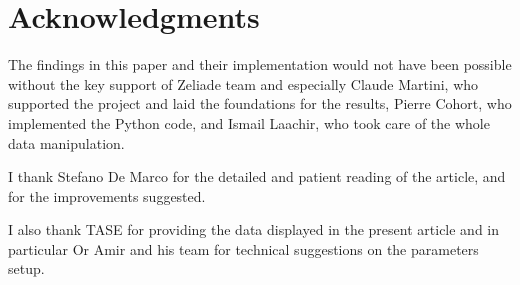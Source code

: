 \documentclass{article}
\begin{document}
	\hypertarget{acknowledgments}{%
\section{Acknowledgments}\label{acknowledgments}}

	The findings in this paper and their implementation would not have been
possible without the key support of Zeliade team and especially Claude
Martini, who supported the project and laid the foundations for the
results, Pierre Cohort, who implemented the Python code, and Ismail
Laachir, who took care of the whole data manipulation.

I thank Stefano De Marco for the detailed and patient reading of the
article, and for the improvements suggested.

I also thank TASE for providing the data displayed in the present
article and in particular Or Amir and his team for technical suggestions
on the parameters setup.



    
    
\newpage 


    
\end{document}
